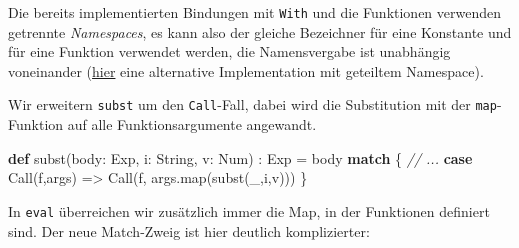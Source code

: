 \documentclass[]{article}
\newenvironment{Shaded}{}{}
\newcommand{\CommentTok}[1]{\textcolor[rgb]{0.38,0.63,0.69}{\textit{#1}}}
\newcommand{\FunctionTok}[1]{\textcolor[rgb]{0.02,0.16,0.49}{#1}}
\newcommand{\KeywordTok}[1]{\textcolor[rgb]{0.00,0.44,0.13}{\textbf{#1}}}
\newcommand{\NormalTok}[1]{#1}
\begin{document}
Die bereits implementierten Bindungen mit \texttt{With} und die
Funktionen verwenden getrennte \emph{Namespaces}, es kann also der
gleiche Bezeichner für eine Konstante und für eine Funktion verwendet
werden, die Namensvergabe ist unabhängig voneinander
(\href{https://github.com/DavidLaewen/programmiersprachen1/blob/main/additional-material/F1-WAESharedNamespace.scala}{hier}
eine alternative Implementation mit geteiltem Namespace).

Wir erweitern \texttt{subst} um den \texttt{Call}-Fall, dabei wird die
Substitution mit der \texttt{map}-Funktion auf alle Funktionsargumente
angewandt.

\begin{Shaded}
\begin{Highlighting}[]
\KeywordTok{def} \FunctionTok{subst}\NormalTok{(body: Exp, i: String, v: Num) : Exp = body }\KeywordTok{match}\NormalTok{ \{}
  \CommentTok{// ...}
  \KeywordTok{case} \FunctionTok{Call}\NormalTok{(f,args) =\textgreater{} }\FunctionTok{Call}\NormalTok{(f, args.}\FunctionTok{map}\NormalTok{(}\FunctionTok{subst}\NormalTok{(\_,i,v)))}
\NormalTok{\}}
\end{Highlighting}
\end{Shaded}

In \texttt{eval} überreichen wir zusätzlich immer die Map, in der
Funktionen definiert sind. Der neue Match-Zweig ist hier deutlich
komplizierter:
\end{document}
